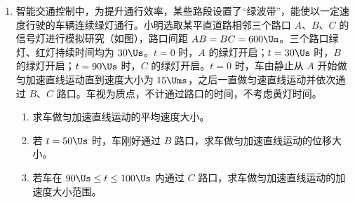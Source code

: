 \documentclass[\gkver]{gaokaozhenti}
\begin{document}
\begin{enumerate}
\item
智能交通控制中，为提升通行效率，某些路段设置了“绿波带”，能使以一定速度行驶的车辆连续绿灯通行。小明选取某平直道路相邻三个路口 $A$、$B$、$C$ 的信号灯进行模拟研究（如图），路口间距 $AB=BC=600 \Um$。三个路口绿灯、红灯持续时间均为 $30 \Us$。$t=0$ 时，$A$ 的绿灯开启；$t=30 \Us$ 时，$B$ 的绿灯开启；$t=90 \Us$ 时，$C$ 的绿灯开启。$t=0$ 时，车由静止从 $A$ 开始做匀加速直线运动直到速度大小为 $15 \Ums$，之后一直做匀速直线运动并依次通过 $B$、$C$ 路口。车视为质点，不计通过路口的时间，不考虑黄灯时间。
\begin{enumerate}
	\item
	求车做匀加速直线运动的平均速度大小。
	\item
	若 $t=50 \Us$ 时，车刚好通过 $B$ 路口，求车做匀加速直线运动的位移大小。
	\item
	若车在 $90 \Us\leq t\leq100 \Us$ 内通过 $C$ 路口，求车做匀加速直线运动的加速度大小范围。
\end{enumerate}
\onepicture[align=right, w=10.00cm]{}


\end{enumerate}
\end{document}
